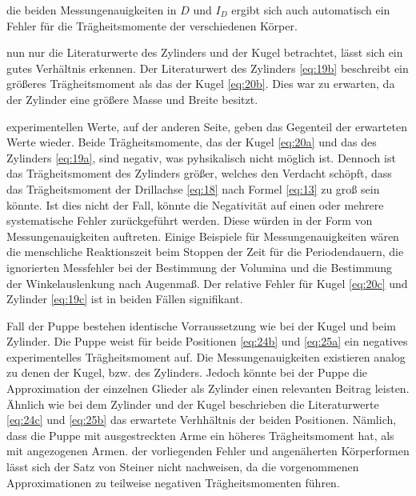 \justifying die beiden Messungenauigkeiten in $D$ und $I_D$ ergibt
sich auch automatisch ein Fehler für die Trägheitsmomente der verschiedenen Körper.

\justifying nun nur die Literaturwerte des Zylinders und der Kugel betrachtet, lässt sich ein gutes Verhältnis erkennen.
Der Literaturwert des Zylinders \eqref{eq:19b} beschreibt ein größeres Trägheitsmoment als das der Kugel \eqref{eq:20b}. Dies war zu erwarten,
da der Zylinder eine größere Masse und Breite besitzt. 

\justifying experimentellen Werte, auf der anderen Seite, geben das Gegenteil der erwarteten Werte wieder. Beide Trägheitsmomente, 
das der Kugel \eqref{eq:20a} und das des Zylinders \eqref{eq:19a}, sind negativ, was pyhsikalisch nicht möglich ist. Dennoch ist das Trägheitsmoment 
des Zylinders größer, welches den Verdacht schöpft, dass das Trägheitsmoment der Drillachse \eqref{eq:18} nach Formel \eqref{eq:13} zu groß 
sein könnte. Ist dies nicht der Fall, könnte die Negativität auf einen oder mehrere systematische Fehler zurückgeführt werden. Diese würden 
in der Form von Messungenauigkeiten auftreten. Einige Beispiele für Messungenauigkeiten wären die menschliche Reaktionszeit beim Stoppen der Zeit
für die Periodendauern, die ignorierten Messfehler bei der Bestimmung der Volumina und die Bestimmung der Winkelauslenkung nach Augenmaß.
Der relative Fehler für Kugel \eqref{eq:20c} und Zylinder \eqref{eq:19c} ist in beiden Fällen signifikant. 

\justifying Fall der Puppe bestehen identische Vorraussetzung wie bei der Kugel und beim Zylinder. Die Puppe weist für beide Positionen
\eqref{eq:24b} und \eqref{eq:25a} ein negatives experimentelles Trägheitsmoment auf. Die Messungenauigkeiten existieren analog zu denen der Kugel, 
bzw. des Zylinders. Jedoch könnte bei der Puppe die Approximation der einzelnen Glieder als Zylinder einen relevanten Beitrag leisten. 
Ähnlich wie bei dem Zylinder und der Kugel beschrieben die Literaturwerte \eqref{eq:24c} und \eqref{eq:25b} das erwartete Verhhältnis der beiden 
Positionen. Nämlich, dass die Puppe mit ausgestreckten Arme ein höheres Trägheitsmoment hat, als mit angezogenen Armen. 
\justifying der vorliegenden Fehler und angenäherten Körperformen lässt sich der Satz von Steiner nicht 
 nachweisen, da die vorgenommenen Approximationen zu teilweise negativen Trägheitsmomenten führen.

\newpage

\printbibliography
